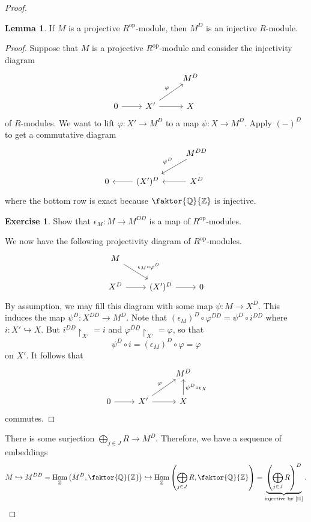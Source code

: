 \documentclass[10pt,letterpaper,cm]{nupset}
\theoremstyle{definition}
\theoremstyle{theorem}
\newtheorem{lemma}[definition]{Lemma}
\newtheorem{exercise}[definition]{Exercise}
\theoremstyle{remark}
\newcommand{\Q}{\mathbb Q}
\newcommand{\Z}{\mathbb Z}
\newcommand{\1}{\mathbf{1}}
\newcommand{\0}{\vec 0}
\DeclareMathOperator{\op}{op}
\DeclareMathOperator{\Hom}{Hom}
\begin{document}
\begin{proof}
\begin{lemma}\label{l1}
If $M$ is a projective $R^{\op}$-module, then $M^D$ is an injective $R$-module.
\end{lemma}
\begin{proof}
Suppose that $M$ is a projective $R^{\op}$-module and consider the injectivity diagram 
\[
\begin{tikzcd}
 &  & M^D \\
0 \arrow[r] & X' \arrow[r] \arrow[ru, "\varphi"] & X
\end{tikzcd}
\] of $R$-modules. We want to lift $\varphi : X' \to M^D$ to a map $\psi : X \to M^D$.  Apply $\left(-\right)^D$ to get a commutative diagram
\[
\begin{tikzcd}
 &  & M^{DD} \arrow[ld, "\varphi^D"'] \\
0 & (X')^D \arrow[l] & X^D \arrow[l]
\end{tikzcd}
\]
where the bottom row is exact because $\faktor{\Q}{\Z}$ is injective. 
\begin{exercise}                                                                                                  
Show that $\epsilon_M: M \to M^{DD}$ is a map of $R^{\op}$-modules.                                               
\end{exercise}   
We now have the following projectivity diagram of $R^{\op}$-modules.
\[
\begin{tikzcd}
M \arrow[rd, "\epsilon_M \circ \varphi^D"] &  &  \\
X^D \arrow[r] & (X')^D \arrow[r] & 0
\end{tikzcd}
\]
By assumption, we may fill this diagram with some map $\psi : M \to X^D$. This induces the map $\psi^D : X^{DD} \to M^D$. Note that $\left(\epsilon_M\right)^D \circ \varphi^{DD} = \psi^D \circ i^{DD}$ where $i : X' \hookrightarrow X$. But $i^{DD}\restriction_{X'} =i$ and $\varphi^{DD}\restriction_{X'} = \varphi$, so that $$\psi^D \circ i = \left(\epsilon_M\right)^D \circ  \varphi = \varphi$$ on $X'$. It follows that
\[
\begin{tikzcd}
 &  & M^D \\
0 \arrow[r] & X' \arrow[r] \arrow[ru, "\varphi"] & X \arrow[u, "\psi^D \circ \epsilon_X"']
\end{tikzcd}
\] commutes.
\end{proof}
There is some surjection $\bigoplus_{j\in J} R \to M^D$. Therefore, we have a sequence of embeddings $$M \hookrightarrow M^{DD} =\Hom_{\Z}\left(M^D, \faktor{\Q}{\Z} \right) \hookrightarrow \Hom_{\Z}\left(\bigoplus_{j\in J} R, \faktor{\Q}{\Z}\right) = \underbrace{\left(\bigoplus_{j\in J} R \right)^D}_{\text{injective by \cref{l1}}}.$$
\end{proof}
\end{document}
